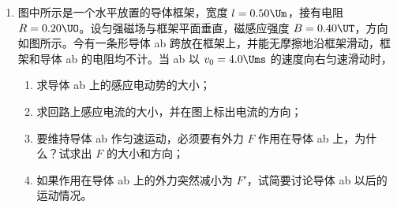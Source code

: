 \documentclass[\gkver]{gaokaozhenti}
\begin{document}
\begin{enumerate}
{$v=\sqrt{u^{2}-2gh}=\sqrt{6^{2}-2\times10\times1.0}\Ums$（1 分）

$=4.0\Ums$（1 分）

小车在 D 点所受重力 $G$【等于 $(M+m)g$】和支持力 $N$ 的合力就是向心力，有：

$(M+m)g-N=\frac{(M+m)v^{2}}{R}$（1 分）

$N=(M+m)(g-\frac{v^{2}}{R})=(60+20)(10-\frac{16}{32})\UN$（1 分）

$=760\UN$（1 分）

小车对轨道的压力跟小车所受的支持力大小相等，方向相反，即大小也为 $760\UN$。（如只算小车质量，其余部分都正确而算出压力是 $190\UN$ 的，该最后 4 分中只给 2 分。）
}

\item
图中所示是一个水平放置的导体框架，宽度 $l=0.50\Um$，接有电阻 $R=0.20\UO$。设匀强磁场与框架平面垂直，磁感应强度 $B=0.40\UT$，方向如图所示。今有一条形导体 ab 跨放在框架上，并能无摩擦地沿框架滑动，框架和导体 ab 的电阻均不计。当 ab 以 $v_{0}=4.0\Ums$ 的速度向右匀速滑动时，
\begin{enumerate}
	\item
	求导体 ab 上的感应电动势的大小；
	\item
	求回路上感应电流的大小，并在图上标出电流的方向；
	\item
	要维持导体 ab 作匀速运动，必须要有外力 $F$ 作用在导体 ab 上，为什么？试求出 $F$ 的大小和方向；
	\item
	如果作用在导体 ab 上的外力突然减小为 $F'$，试简要讨论导体 ab 以后的运动情况。
\end{enumerate}
\onepicture[align=right, w=6cm]{}

\end{enumerate}
\end{document}
